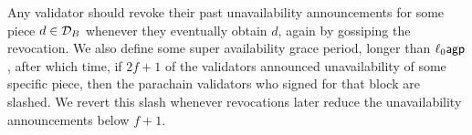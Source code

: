 Any validator should revoke their past unavailability announcements for some piece $d \in \mathcal{D}_B$ whenever they eventually obtain $d$, again by gossiping the revocation.  We also define some super availability grace period, longer than $\ell_0 \mathsf{agp}$, after which time, if $2f+1$ of the validators announced unavailability of some specific piece, then the parachain validators who signed for that block are slashed.
We revert this slash whenever revocations later reduce the unavailability announcements below $f+1$.



